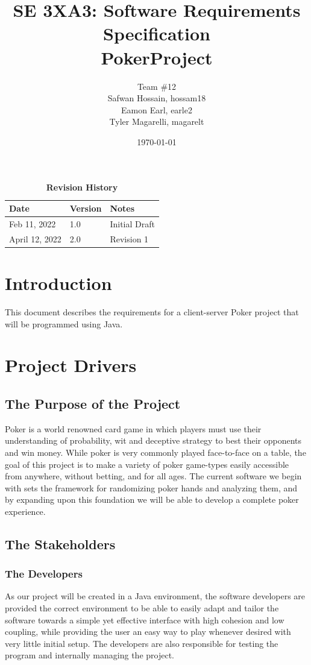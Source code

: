 \documentclass[12pt, titlepage]{article}
\title{SE 3XA3: Software Requirements Specification\\PokerProject}
\author{Team \#12
        \\ Safwan Hossain, hossam18
        \\ Eamon Earl, earle2
        \\ Tyler Magarelli, magarelt
}
\date{\today}
\begin{document}
\maketitle

\tableofcontents
\listoftables
\listoffigures

\begin{table}[bp]
\caption{\bf Revision History}
\begin{tabularx}{\textwidth}{p{3cm}p{2cm}X}
\toprule {\bf Date} & {\bf Version} & {\bf Notes}\\
\midrule
Feb 11, 2022 & 1.0 & Initial Draft\\
April 12, 2022 & 2.0 & Revision 1\\
\bottomrule
\end{tabularx}
\end{table}

\newpage


\section{Introduction}
This document describes the requirements for a client-server Poker project that will be programmed using Java.

\section{Project Drivers}

\subsection{The Purpose of the Project}
Poker is a world renowned card game in which players must use their understanding of probability,
wit and deceptive strategy to best their opponents and win money. While poker is very commonly
played face-to-face on a table, the goal of this project is to make a variety of poker game-types easily
accessible from anywhere, without betting, and for all ages. The current software we begin with sets the framework for randomizing
poker hands and analyzing them, and by expanding upon this foundation we will be able to develop a complete poker
experience.
\subsection{The Stakeholders}

\subsubsection{The Developers}
As our project will be created in a Java environment, the software developers are provided the correct environment to be able to easily adapt and tailor the software towards a simple yet effective interface with high cohesion and low coupling,
while providing the user an easy way to play whenever desired with very little initial setup. The developers are also responsible for testing the program and internally managing the project.
\end{document}
